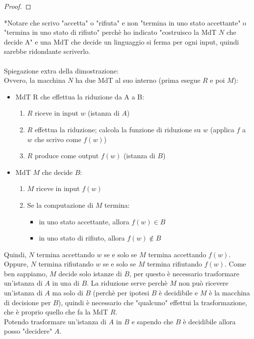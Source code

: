 \documentclass{article}  %
\theoremstyle{definition}
\begin{document}
\begin{esercizio}[Dimostrazione 3.1]
\begin{proof}
  \end{proof}
  *Notare che scrivo "accetta" o "rifiuta" e non "termina in uno stato accettante" o "termina in uno stato di rifiuto" perchè
ho indicato "costruisco la MdT $N$ che decide A" e una MdT che decide un linguaggio si ferma per ogni input, quindi sarebbe ridondante
scriverlo. \\ \\
Spiegazione extra della dimostrazione: \\
Ovvero, la macchina $N$ ha due MdT al suo interno (prima esegue $R$ e poi $M$): 
\begin{itemize}
  \item MdT R che effettua la riduzione da A a B: 
  \begin{enumerate}
    \item $R$ riceve in input $w$ (istanza di $A$)
    \item $R$ effettua la riduzione; calcola la funzione di riduzione su $w$ (applica $f$ a $w$ che scrivo come $f(w)$)
    \item $R$ produce come output $f(w)$ (istanza di $B$)
  \end{enumerate}
  \item MdT $M$ che decide $B$:
  \begin{enumerate}
    \item $M$ riceve in input $f(w)$ 
    \item Se la computazione di $M$ termina:
    \begin{itemize}
      \item in uno stato accettante, allora $f(w) \in B$ 
      \item in uno stato di rifiuto, allora $f(w) \notin B$ 
    \end{itemize}
  \end{enumerate}
\end{itemize}
Quindi, $N$ termina accettando $w$ se e solo se $M$ termina accettando $f(w)$. Oppure, $N$ termina rifiutando $w$ se e solo se $M$ termina 
rifiutando $f(w)$.
Come ben sappiamo, $M$ decide solo istanze di $B$, per questo è necessario trasformare un'istanza di $A$ in una di $B$. 
La riduzione serve perchè $M$ non può ricevere un'istanza di $A$ ma solo di $B$ (perchè per ipotesi $B$ è decidibile e $M$ è
la macchina di decisione per $B$), quindi è necessario che "qualcuno" effettui la trasformazione, che è proprio quello che fa la MdT $R$.\\
Potendo trasformare un'istanza di $A$ in $B$ e sapendo che $B$ è decidibile allora posso "decidere" $A$.
\end{esercizio}
\end{document}
